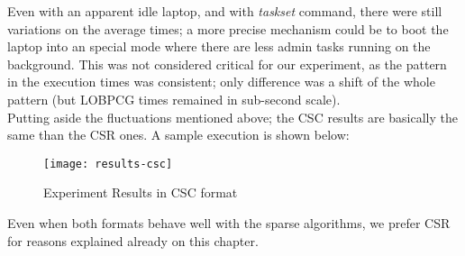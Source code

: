Even with an apparent idle laptop,
  and with \emph{taskset} command, there were still variations on the
  average times; a more precise mechanism could be to boot the laptop
  into an special mode where there are less admin tasks running on the
background. This was not considered critical for our experiment, as
the pattern in the execution times was consistent; only difference was
a shift of the whole pattern (but \gls{LOBPCG} times remained in sub-second
scale). \\ 

Putting aside the fluctuations mentioned above; the CSC results are
basically the same than the CSR ones. A sample execution is shown
below: 

\begin{figure}[H]
  \centering
  \caption{Experiment Results in CSC format}   
  \texttt{[image: results-csc]}
\end{figure}

Even when both formats behave well with the sparse algorithms, we
prefer CSR for reasons explained already on this chapter.
